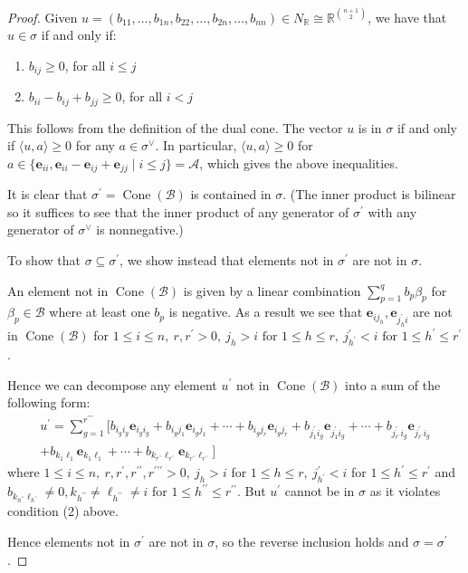 \documentclass[12pt]{amsart}
\newcommand{\vect}[1]{\mathbf{#1}}
\DeclareMathOperator{\Cone}{Cone}
\theoremstyle{plain}
\theoremstyle{definition}
\theoremstyle{remark}
\begin{document}
\begin{proof}
    Given $u = (b_{11},\dots,b_{1n},b_{22},\dots,b_{2n},\dots,b_{nn})\in N_{\mathbb{R}}\cong \mathbb{R}^{\binom{n+1}{2}}$, we have that $u\in\sigma$ if and only if: \begin{enumerate}
        \item $b_{ij}\geq 0$, for all $i\leq j$
        \item $b_{ii}-b_{ij}+b_{jj}\geq 0$, for all $ i< j$
    \end{enumerate}
    This follows from the definition of the dual cone. The vector $u$ is in $\sigma$ if and only if $\langle u,a\rangle \geq 0$ for any $a\in \sigma^\vee$. In particular, $\langle u,a\rangle \geq 0$ for $a\in \{\vect e_{ii}, \vect e_{ii} - \vect e_{ij} + \vect e_{jj}\mid i\leq j\} = \mathscr{A}$, which gives the above inequalities. 


    It is clear that $\sigma^\prime = \Cone(\mathscr{B})$ is contained in $\sigma$. (The inner product is bilinear so it suffices to see that the inner product of any generator of $\sigma^\prime$ with any generator of $\sigma^\vee$ is nonnegative.)

    To show that $\sigma\subseteq \sigma^\prime$, we show instead that elements not in $\sigma^\prime$ are not in $\sigma$.
    
    An element not in $\Cone(\mathscr{B})$ is given by a linear combination $\sum_{p=1}^q b_p\beta_p$ for $\beta_p\in \mathscr{B}$ where at least one $b_p$ is negative. As a result we see that $\vect e_{ij_h}, \vect e_{j_h^{\prime}i}$ are not in $\Cone(\mathscr{B})$ for $1\leq i\leq n,~ r,r^\prime >0,~ j_h>i \text{ for } 1\leq h \leq r,~ j^\prime_{h^\prime}< i\text{ for } 1\leq h^\prime\leq r^\prime$. 

    Hence we can decompose any element $u^{\prime}$ not in $\Cone(\mathscr{B})$ into a sum of the following form: \begin{multline*}
        u^{\prime} = \sum_{g = 1}^{r^{\prime\prime\prime}}  \big[ b_{i_gi_g}\vect e_{i_gi_g} +  b_{i_gj_1}\vect e_{i_gj_1} +\cdots + b_{i_gj_r}\vect e_{i_gj_r} + b_{j^{\prime}_1i_g}\vect e_{j^{\prime}_1i_g} +\cdots + b_{j^{\prime}_{r^{\prime}}i_g}\vect e_{j^{\prime}_{r^{\prime}}i_g} \\  + b_{k_1\ell_1}\vect e_{k_1\ell_1} +\cdots + b_{k_{r^{\prime\prime}}\ell_{r^{\prime\prime}}}\vect e_{k_{r^{\prime\prime}}\ell_{r^{\prime\prime}}} \big]
    \end{multline*} where $1\leq i\leq n,~ r,r^\prime,r^{\prime\prime}, r^{\prime\prime\prime} >0,~ j_h>i$ for $1\leq h \leq r,~ j^\prime_{h^\prime}< i$ for $1\leq h^\prime\leq r^\prime$ and $b_{k_{h^{\prime\prime}}\ell_{h^{\prime\prime}}} \neq 0 , k_{h^{\prime\prime}}\neq \ell_{h^{\prime\prime}}\neq i$ for $1\leq h^{\prime\prime}\leq r^{\prime\prime}$. But $u^{\prime}$ cannot be in $\sigma$ as it violates condition (2) above.

    Hence elements not in $\sigma^\prime$ are not in $\sigma$, so the reverse inclusion holds and $\sigma = \sigma^\prime$.
\end{proof}
\newpage
\end{document}
